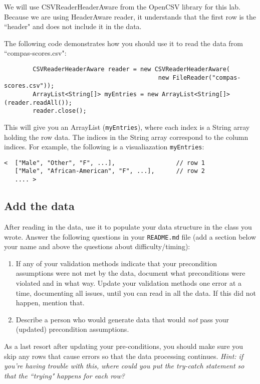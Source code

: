 \documentclass[12pt]{article}
\begin{document}
We will use CSVReaderHeaderAware from the OpenCSV library for this lab. Because we are using HeaderAware reader, it understands that the first row is the ``header" and does not include it in the data.

The following code demonstrates how you should use it to read the data from ``compas-scores.csv":

\begin{verbatim}
		CSVReaderHeaderAware reader = new CSVReaderHeaderAware(
		                                   new FileReader("compas-scores.csv"));
		ArrayList<String[]> myEntries = new ArrayList<String[]>(reader.readAll());
		reader.close();
\end{verbatim}
This will give you an ArrayList (\texttt{myEntries}), where each index is a String array holding the row data. The indices in the String array correspond to the column indices. For example, the following is a visualiazation \texttt{myEntries}:
\begin{verbatim}
<  ["Male", "Other", "F", ...],                 // row 1
   ["Male", "African-American", "F", ...],      // row 2
   .... >
\end{verbatim}

\subsection{Add the data}
After reading in the data, use it to populate your data structure in the class you wrote. Answer the following questions in your \texttt{README.md} file (add a section below your name and above the questions about difficulty/timing):
\begin{enumerate}
\item If any of your validation methods indicate that your precondition assumptions were not met by the data, document what preconditions were violated and in what way.  Update your validation methods one error at a time, documenting all issues, until you can read in all the data.  If this did not happen, mention that.
\item Describe a person who would generate data that would \emph{not} pass your (updated) precondition assumptions.
\end{enumerate}

As a last resort after updating your pre-conditions, you should make sure you skip any rows that cause errors so that the data processing continues. \textit{Hint: if you're having trouble with this, where could you put the try-catch statement so that the ``trying" happens for each row?}
\end{document}
